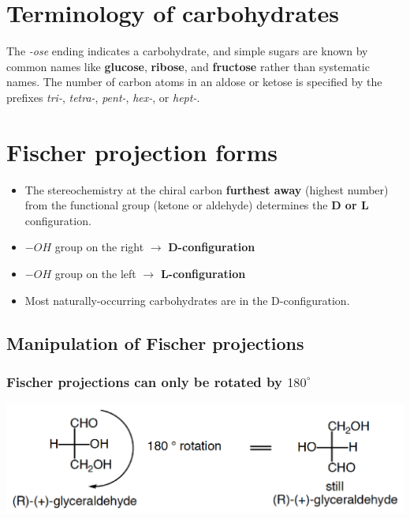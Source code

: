 \documentclass[11pt]{article}
\begin{document}
\section{Terminology of carbohydrates}
\label{sec:orgf16744f}
The \emph{-ose} ending indicates a carbohydrate, and simple sugars are known by common names like \textbf{glucose}, \textbf{ribose}, and \textbf{fructose} rather than systematic names. The number of carbon atoms in an aldose or ketose is specified by the prefixes \emph{tri-}, \emph{tetra-}, \emph{pent-}, \emph{hex-}, or \emph{hept-}.
\section{Fischer projection forms}
\label{sec:orged6e20b}
\begin{itemize}
\item The stereochemistry at the chiral carbon \textbf{furthest away} (highest number) from the functional group (ketone or aldehyde) determines the \textbf{D or L} configuration.
\item \(-OH\) group on the right \(\rightarrow\) \textbf{D-configuration}
\item \(-OH\) group on the left \(\rightarrow\) \textbf{L-configuration}
\item Most naturally-occurring carbohydrates are in the D-configuration.
\end{itemize}
\subsection{Manipulation of Fischer projections}
\label{sec:org91726af}

\subsubsection{Fischer projections can only be rotated by \(180^{\circ}\)}
\label{sec:orgb7d11e1}
\begin{center}
\includegraphics[width=.9\linewidth]{./images/180-rotation.png}
\end{center}
\end{document}

